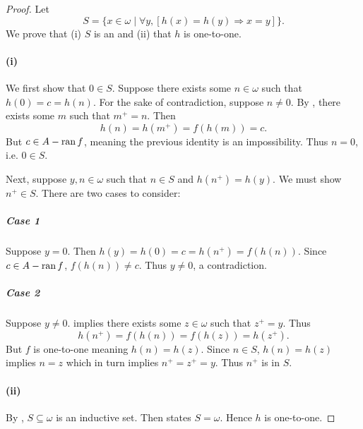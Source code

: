 \documentclass{report}
\begin{document}
  \begin{proof}

    Let
      $$S = \{x \in \omega \mid \forall y,
        \left[ h(x) = h(y) \Rightarrow x = y \right]\}.$$
    We prove that (i) $S$ is an  and (ii) that $h$ is
      one-to-one.

    \paragraph{(i)}%

      We first show that $0 \in S$.
      Suppose there exists some $n \in \omega$ such that $h(0) = c = h(n)$.
      For the sake of contradiction, suppose $n \neq 0$.
      By , there exists some $m$ such that $m^+ = n$.
      Then $$h(n) = h(m^+) = f(h(m)) = c.$$
      But $c \in A - \mathop{\text{ran}}{f}$, meaning the previous identity is an
        impossibility.
      Thus $n = 0$, i.e. $0 \in S$.

      Next, suppose $y, n \in \omega$ such that $n \in S$ and $h(n^+) = h(y)$.
      We must show $n^+ \in S$.
      There are two cases to consider:

      \subparagraph{Case 1}%

        Suppose $y = 0$.
        Then $h(y) = h(0) = c = h(n^+) = f(h(n))$.
        Since $c \in A - \mathop{\text{ran}}{f}$, $f(h(n)) \neq c$.
        Thus $y \neq 0$, a contradiction.

      \subparagraph{Case 2}%

        Suppose $y \neq 0$.
         implies there exists some $z \in \omega$ such
          that $z^+ = y$.
        Thus $$h(n^+) = f(h(n)) = f(h(z)) = h(z^+).$$
        But $f$ is one-to-one meaning $h(n) = h(z)$.
        Since $n \in S$, $h(n) = h(z)$ implies $n = z$ which in turn implies
          $n^+ = z^+ = y$.
        Thus $n^+$ is in $S$.

    \paragraph{(ii)}%

      By , $S \subseteq \omega$ is an inductive set.
      Then  states $S = \omega$.
      Hence $h$ is one-to-one.

  \end{proof}

\subsection{}%
\end{document}
